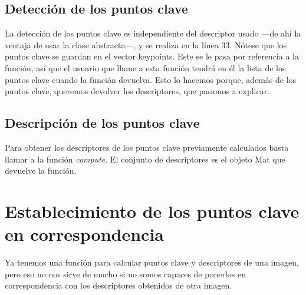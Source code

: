 \documentclass[a4paper, 11pt]{article}
\theoremstyle{definition}
\theoremstyle{theorem}
\begin{document}
  \subsection{Detección de los puntos clave}
  La detección de los puntos clave es independiente del descriptor usado ---de ahí la ventaja de usar la clase abstracta---, y se realiza en la línea 33. Nótese que los puntos clave se guardan en el vector keypoints. Este se le pasa por referencia a la función, así que el usuario que llame a esta función tendrá en él la lista de los puntos clave cuando la función devuelva. Esto lo hacemos porque, además de los puntos clave, queremos devolver los descriptores, que pasamos a explicar.

  \subsection{Descripción de los puntos clave}
  Para obtener los descriptores de los puntos clave previamente calculados basta llamar a la función \emph{compute}. El conjunto de descriptores es el objeto Mat que devuelve la función.

  \section{Establecimiento de los puntos clave en correspondencia}
  Ya tenemos una función para calcular puntos clave y descriptores de una imagen, pero eso no nos sirve de mucho si no somos capaces de ponerlos en correspondencia con los descriptores obtenidos de otra imagen.
\end{document}
